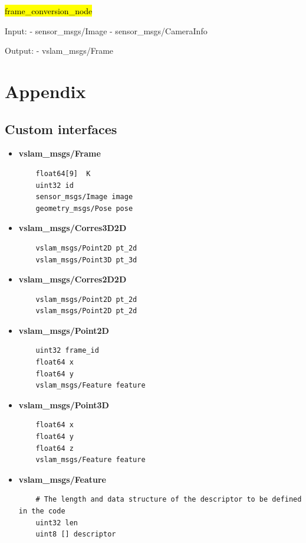 \hl{frame\_conversion\_node}

Input: 
- sensor\_msgs/Image
- sensor\_msgs/CameraInfo

Output:
- vslam\_msgs/Frame


\section{Appendix}

\subsection{Custom interfaces}

\begin{itemize}
  \item \textbf{vslam\_msgs/Frame}
  \begin{verbatim}
    float64[9]  K 
    uint32 id 
    sensor_msgs/Image image
    geometry_msgs/Pose pose
  \end{verbatim}

  \item \textbf{vslam\_msgs/Corres3D2D}
  \begin{verbatim}
    vslam_msgs/Point2D pt_2d
    vslam_msgs/Point3D pt_3d
  \end{verbatim}

  \item \textbf{vslam\_msgs/Corres2D2D}
  \begin{verbatim}
    vslam_msgs/Point2D pt_2d
    vslam_msgs/Point2D pt_2d
  \end{verbatim}

  \item \textbf{vslam\_msgs/Point2D}
  \begin{verbatim}
    uint32 frame_id
    float64 x 
    float64 y 
    vslam_msgs/Feature feature 
  \end{verbatim}

  \item \textbf{vslam\_msgs/Point3D}
  \begin{verbatim}
    float64 x
    float64 y  
    float64 z 
    vslam_msgs/Feature feature
  \end{verbatim}

  \item \textbf{vslam\_msgs/Feature}
  \begin{verbatim}
    # The length and data structure of the descriptor to be defined in the code
    uint32 len
    uint8 [] descriptor
  \end{verbatim}
  
\end{itemize}











